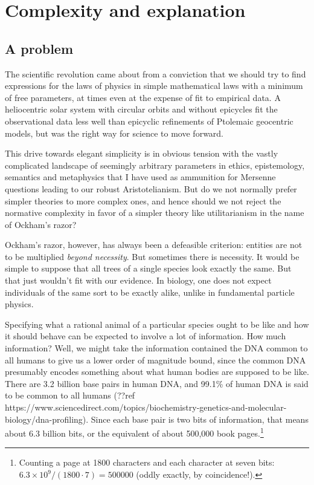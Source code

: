
\section{Complexity and explanation}\label{sec:hierarchy}
\subsection{A problem}
The scientific revolution came about from a conviction that we should try to find expressions for the laws
of physics in simple mathematical laws with a minimum of free parameters, at times even at the expense of fit 
to empirical data. A heliocentric solar system with circular orbits and without epicycles fit the observational 
data less well than epicyclic refinements of Ptolemaic geocentric models, but was the right way for science to 
move forward. 

This drive towards elegant simplicity is in obvious tension with the vastly complicated landscape of seemingly
arbitrary parameters in ethics, epistemology, semantics and metaphysics that I have used as ammunition for
Mersenne questions leading to our robust Aristotelianism. 
But do we not normally prefer simpler theories to more complex ones, and hence should we not reject the normative
complexity in favor of a simpler theory like utilitarianism in the name of Ockham's razor?

Ockham's razor, however, has always been a defeasible criterion: entities are not to be multiplied \textit{beyond necessity}.
But sometimes there is necessity. It would be simple to suppose that all trees of a single species look exactly the same.
But that just wouldn't fit with our evidence. In biology, one does not expect individuals of the same sort to be exactly
alike, unlike in fundamental particle physics.

Specifying what a rational animal of a particular species ought to be like
and how it should behave can be expected to involve a lot of information. How much information? Well, we might take the information contained
the DNA common to all humans to give us a lower order of magnitude bound, since the common DNA presumably encodes something
about what human bodies are supposed to be like. There are 3.2 billion base pairs in human DNA, and 
99.1\% of human DNA is said to be common to all humans (??ref https://www.sciencedirect.com/topics/biochemistry-genetics-and-molecular-biology/dna-profiling).
Since each base pair is two bits of information, that means about 6.3 billion bits, or the equivalent of about 500,000
book pages.\footnote{Counting a page at 1800 characters and each character at seven bits: $6.3\times 10^9/(1800\cdot 7)=500000$
(oddly exactly, by coincidence!).} 

